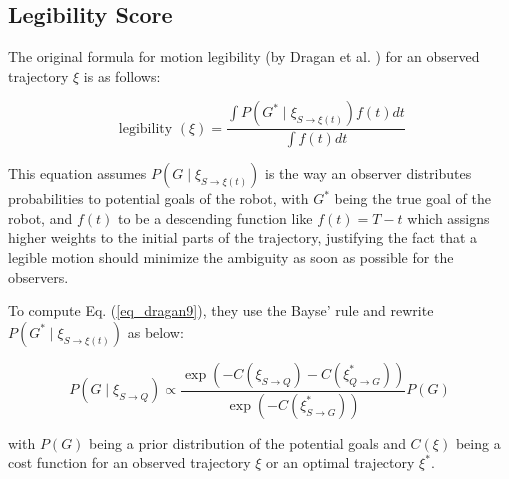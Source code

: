 
\subsection{Legibility Score}

The original formula for motion legibility (by Dragan et al. \cite{dragan2013legibility}) for an observed trajectory $\xi$ \cite{dragan2013legibility} is as follows:

\begin{equation}
    \label{eq_dragan9}
    \text { legibility }(\xi)=\frac{\int P\left(G^* \mid \xi_{S \rightarrow \xi(t)}\right) f(t) d t}{\int f(t) d t}
\end{equation}

\noindent
This equation assumes $P\left(G \mid \xi_{S \rightarrow \xi(t)}\right)$ is the way an observer distributes probabilities to potential goals of the robot, with $G^*$ being the true goal of the robot, and $f(t)$ to be a descending function like $f(t)=T-t$ which assigns higher weights to the initial parts of the trajectory, justifying the fact that a legible motion should minimize the ambiguity as soon as possible for the observers.

\noindent
To compute Eq. (\ref{eq_dragan9}), they use the Bayse' rule and rewrite $P\left(G^* \mid \xi_{S \rightarrow \xi(t)}\right)$ as below:

\begin{equation}
    \label{eq_dragan8}
    P\left(G \mid \xi_{S \rightarrow Q}\right) \propto \frac{\exp \left(-C\left(\xi_{S \rightarrow Q}\right)-C\left(\xi_{Q \rightarrow G}^*\right)\right)}{\exp \left(-C\left(\xi_{S \rightarrow G}^*\right)\right)} P(G)
\end{equation}

\noindent
with $P(G)$ being a prior distribution of the potential goals and $C(\xi)$ being a cost function for an observed trajectory $\xi$ or an optimal trajectory $\xi^*$.


